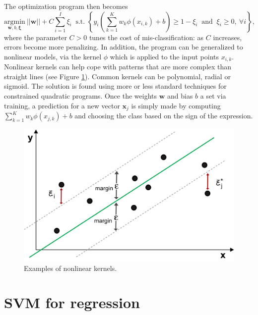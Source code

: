 \documentclass[]{krantz}
\theoremstyle{definition}
\theoremstyle{definition}
\theoremstyle{definition}
\theoremstyle{remark}
\begin{document}
The optimization program then becomes \begin{equation}
\label{eq:svm3}
\underset{\textbf{w},b, \boldsymbol{\xi}}{\text{argmin}} \ ||\textbf{w}||+C\sum_{i=1}^I\xi_i \ \text{ s.t. } \left\{ y_i\left(\sum_{k=1}^Kw_k\phi(x_{i,k})+b \right)\ge 1-\xi_i \ \text{ and } \ \xi_i\ge 0, \ \forall i  \right\},
\end{equation} where the parameter \(C>0\) tunes the cost of
mis-classification: as \(C\) increases, errors become more penalizing.
In addition, the program can be generalized to nonlinear models, via the
kernel \(\phi\) which is applied to the input points \(x_{i,k}\).
Nonlinear kernels can help cope with patterns that are more complex than
straight lines (see Figure \ref{fig:svmscheme3}). Common kernels can be
polynomial, radial or sigmoid. The solution is found using more or less
standard techniques for constrained quadratic programs. Once the weights
\(\textbf{w}\) and bias \(b\) a set via training, a prediction for a new
vector \(\textbf{x}_j\) is simply made by computing
\(\sum_{k=1}^Kw_k\phi(x_{j,k})+b\) and choosing the class based on the
sign of the expression.

\begin{figure}[H]

{\centering \includegraphics[width=500px]{images/svm3} 

}

\caption{Examples of nonlinear kernels.}\label{fig:svmscheme3}
\end{figure}

\hypertarget{svm-for-regression}{%
\section{SVM for regression}\label{svm-for-regression}}
\end{document}
